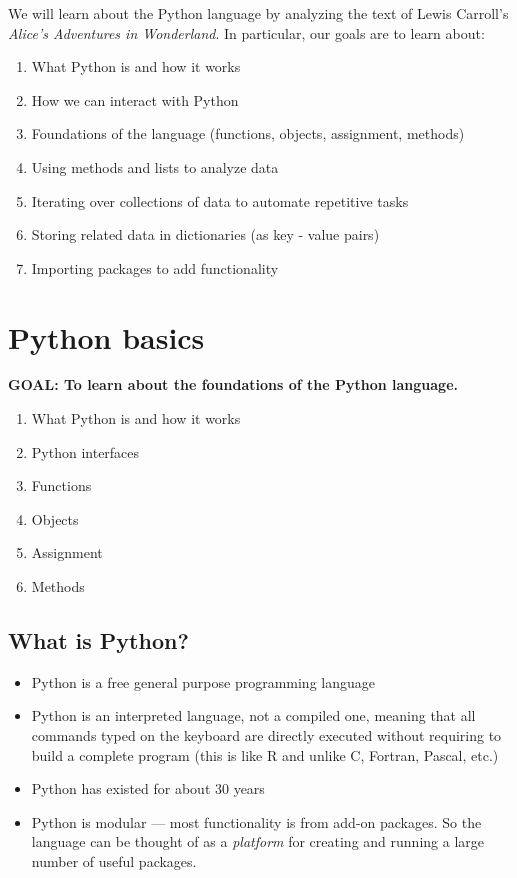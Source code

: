 \documentclass[
]{book}
\providecommand{\tightlist}{%
  \setlength{\itemsep}{0pt}\setlength{\parskip}{0pt}}
\begin{document}
We will learn about the Python language by analyzing the text of Lewis Carroll's \emph{Alice's Adventures in Wonderland}.
In particular, our goals are to learn about:

\begin{enumerate}
\def\labelenumi{\arabic{enumi}.}
\tightlist
\item
  What Python is and how it works
\item
  How we can interact with Python
\item
  Foundations of the language (functions, objects, assignment, methods)
\item
  Using methods and lists to analyze data
\item
  Iterating over collections of data to automate repetitive tasks
\item
  Storing related data in dictionaries (as key - value pairs)
\item
  Importing packages to add functionality
\end{enumerate}

\hypertarget{python-basics}{%
\section{Python basics}\label{python-basics}}

\textbf{GOAL: To learn about the foundations of the Python language.}

\begin{enumerate}
\def\labelenumi{\arabic{enumi}.}
\tightlist
\item
  What Python is and how it works
\item
  Python interfaces
\item
  Functions
\item
  Objects
\item
  Assignment
\item
  Methods
\end{enumerate}

\hypertarget{what-is-python}{%
\subsection{What is Python?}\label{what-is-python}}

\begin{itemize}
\tightlist
\item
  Python is a free general purpose programming language
\item
  Python is an interpreted language, not a compiled one, meaning that all commands
  typed on the keyboard are directly executed without requiring to build a complete
  program (this is like R and unlike C, Fortran, Pascal, etc.)
\item
  Python has existed for about 30 years
\item
  Python is modular --- most functionality is from add-on packages. So the language can
  be thought of as a \emph{platform} for creating and running a large number of useful packages.
\end{itemize}
\end{document}
